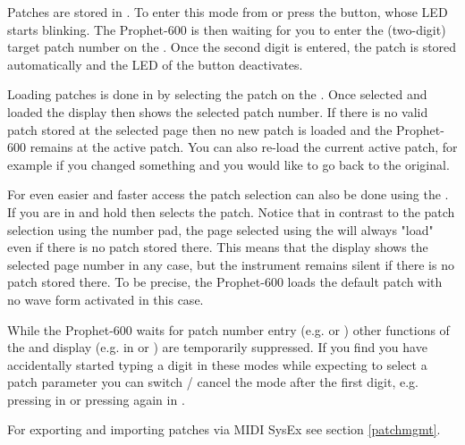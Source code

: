 Patches are stored in \storagemode. To enter this mode from \presetmode or \livemode press the \record button, whose LED starts blinking. The Prophet-600 is then waiting for you to enter the (two-digit) target patch number on the \termnumberpad. Once the second digit is entered, the patch is stored automatically and the LED of the \record button deactivates. 

Loading patches is done in \presetpatch by selecting the patch on the \termnumberpad. Once selected and loaded the display then shows the selected patch number. If there is no valid patch stored at the selected page then no new patch is loaded and the Prophet-600 remains at the active patch. You can also re-load the current active patch, for example if you changed something and you would like to go back to the original. 

For even easier and faster access the patch selection can also be done using the \datadial. If you are in \presetmode and hold \fromtape then \datadial selects the patch. Notice that in contrast to the patch selection using the number pad, the page selected using the \datadial will always "load" even if there is no patch stored there. This means that the display shows the selected page number in any case, but the instrument remains silent if there is no patch stored there. To be precise, the Prophet-600 loads the default patch with no wave form activated in this case. 

While the Prophet-600 waits for patch number entry (e.g. \storagemode or \presetpatch) other functions of the \termnumberpad and display (e.g. in \presetpanel or \livemode) are temporarily suppressed. If you find you have accidentally started typing a digit in these modes while expecting to select a patch parameter you can switch / cancel the mode after the first digit, e.g. pressing \totape in \presetpatch or pressing \record again in \storagemode.

For exporting and importing patches via MIDI SysEx see section \ref{patchmgmt}.
